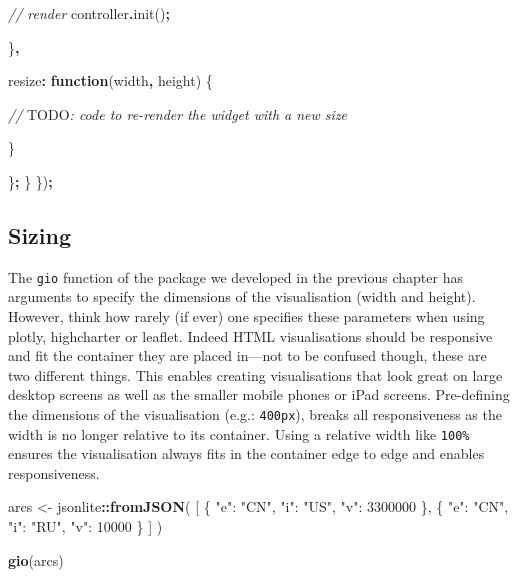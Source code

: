 \documentclass[
]{krantz}
\makeatletter
\newenvironment{Shaded}{\begin{snugshade}}{\end{snugshade}}
\newcommand{\AlertTok}[1]{\textcolor[rgb]{0.33,0.33,0.33}{#1}}
\newcommand{\CommentTok}[1]{\textcolor[rgb]{0.37,0.37,0.37}{\textit{#1}}}
\newcommand{\DataTypeTok}[1]{\textcolor[rgb]{0.27,0.27,0.27}{#1}}
\newcommand{\FunctionTok}[1]{\textcolor[rgb]{0,0,0}{#1}}
\newcommand{\KeywordTok}[1]{\textcolor[rgb]{0.27,0.27,0.27}{\textbf{#1}}}
\newcommand{\NormalTok}[1]{#1}
\newcommand{\OperatorTok}[1]{\textcolor[rgb]{0.43,0.43,0.43}{\textbf{#1}}}
\newcommand{\StringTok}[1]{\textcolor[rgb]{0.5,0.5,0.5}{#1}}
\newenvironment{kframe}{%
\medskip{}
\setlength{\fboxsep}{.8em}
 \def\at@end@of@kframe{}%
 \ifinner\ifhmode%
  \def\at@end@of@kframe{\end{minipage}}%
  \begin{minipage}{\columnwidth}%
 \fi\fi%
 \def\FrameCommand##1{\hskip\@totalleftmargin \hskip-\fboxsep
 \colorbox{shadecolor}{##1}\hskip-\fboxsep
     \hskip-\linewidth \hskip-\@totalleftmargin \hskip\columnwidth}%
 \MakeFramed {\advance\hsize-\width
   \@totalleftmargin\z@ \linewidth\hsize
   \@setminipage}}%
 {\par\unskip\endMakeFramed%
 \at@end@of@kframe}
\renewenvironment{Shaded}{\begin{kframe}}{\end{kframe}}
\makeatother
\begin{document}
\begin{Shaded}
\begin{Highlighting}[]
        \CommentTok{// render}
\NormalTok{        controller}\OperatorTok{.}\FunctionTok{init}\NormalTok{()}\OperatorTok{;}

\NormalTok{      \}}\OperatorTok{,}

      \DataTypeTok{resize}\OperatorTok{:} \KeywordTok{function}\NormalTok{(width}\OperatorTok{,}\NormalTok{ height) \{}

        \CommentTok{// }\AlertTok{TODO}\CommentTok{: code to re{-}render the widget with a new size}

\NormalTok{      \}}

\NormalTok{    \}}\OperatorTok{;}
\NormalTok{  \}}
\NormalTok{\})}\OperatorTok{;}
\end{Highlighting}
\end{Shaded}

\hypertarget{sizing}{%
\subsection*{Sizing}\label{sizing}}


The \texttt{gio} function of the package we developed in the previous chapter has arguments to specify the dimensions of the visualisation (width and height). However, think how rarely (if ever) one specifies these parameters when using plotly, highcharter or leaflet. Indeed HTML visualisations should be responsive and fit the container they are placed in---not to be confused though, these are two different things. This enables creating visualisations that look great on large desktop screens as well as the smaller mobile phones or iPad screens. Pre-defining the dimensions of the visualisation (e.g.: \texttt{400px}), breaks all responsiveness as the width is no longer relative to its container. Using a relative width like \texttt{100\%} ensures the visualisation always fits in the container edge to edge and enables responsiveness.

\begin{Shaded}
\begin{Highlighting}[]
\NormalTok{arcs \textless{}{-}}\StringTok{ }\NormalTok{jsonlite}\OperatorTok{::}\KeywordTok{fromJSON}\NormalTok{(}
  \StringTok{\textquotesingle{}[}
\StringTok{    \{}
\StringTok{      "e": "CN",}
\StringTok{      "i": "US",}
\StringTok{      "v": 3300000}
\StringTok{    \},}
\StringTok{    \{}
\StringTok{      "e": "CN",}
\StringTok{      "i": "RU",}
\StringTok{      "v": 10000}
\StringTok{    \}}
\StringTok{  ]\textquotesingle{}}
\NormalTok{)}

\KeywordTok{gio}\NormalTok{(arcs)}
\end{Highlighting}
\end{Shaded}
\end{document}
